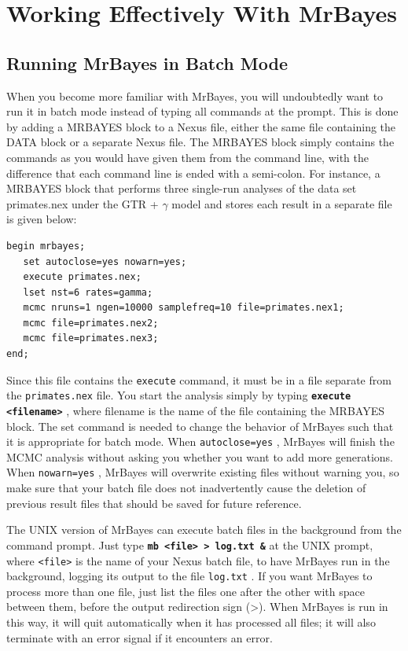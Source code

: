 \documentclass[12pt]{book}
\newcommand{\ttt}[1]{\texttt{#1} }
\newcommand{\tb}[1]{\texttt{\textbf{#1}} }
\begin{document}
\section{Working Effectively With MrBayes}

\subsection{Running MrBayes in Batch Mode}

When you become more familiar with MrBayes, you will undoubtedly want to run it in batch mode
instead of typing all commands at the prompt. This is done by adding a MRBAYES block to a Nexus
file, either the same file containing the DATA block or a separate Nexus file. The MRBAYES block
simply contains the commands as you would have given them from the command line, with the
difference that each command line is ended with a semi-colon. For instance, a MRBAYES block that
performs three single-run analyses of the data set primates.nex under the GTR + $\gamma$  model and
stores each result in a separate file is given below:

\begin{singlespacing}
\small
\begin{verbatim}
begin mrbayes;
   set autoclose=yes nowarn=yes;
   execute primates.nex;
   lset nst=6 rates=gamma;
   mcmc nruns=1 ngen=10000 samplefreq=10 file=primates.nex1;
   mcmc file=primates.nex2;
   mcmc file=primates.nex3;
end;
\end{verbatim}
\normalsize
\end{singlespacing}

Since this file contains the \ttt{execute} command, it must be in a file separate from the
\ttt{primates.nex} file. You start the analysis simply by typing \tb{execute <filename>}, where
filename is the name of the file containing the MRBAYES block.  The set command is needed to change
the behavior of MrBayes such that it is appropriate for batch mode. When \ttt{autoclose=yes},
MrBayes will finish the MCMC analysis without asking you whether you want to add more generations.
When \ttt{nowarn=yes}, MrBayes will overwrite existing files without warning you, so make sure
that your batch file does not inadvertently cause the deletion of previous result files that should
be saved for future reference.

The UNIX version of MrBayes can execute batch files in the background from the command prompt. Just
type \tb{mb <file> > log.txt \&} at the UNIX prompt, where \ttt{<file>} is the name of your Nexus
batch file, to have MrBayes run in the background, logging its output to the file \ttt{log.txt}. If
you want MrBayes to process more than one file, just list the files one after the other with space
between them, before the output redirection sign (>). When MrBayes is run in this way, it will quit
automatically when it has processed all files; it will also terminate with an error signal if it
encounters an error.
\end{document}
